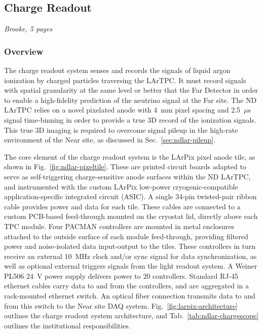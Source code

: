 \subsection{Charge Readout}
\label{sec:lartpc-des-chargero}
{\it Brooke, 5 pages}
\subsubsection{Overview}
\label{sec:lartpc-cro-ovvw}
The charge readout system senses and records the signals of liquid argon ionization by charged particles traversing the LArTPC\@.
It must record signals with spatial granularity at the same level or better that the Far Detector in order to enable a high-fidelity prediction of the neutrino signal at the Far site.
The ND LArTPC relies on a novel pixelated anode with 4~mm pixel spacing and 2.5~$\mu$s signal time-binning in order to provide a true 3D record of the ionization signals.
This true 3D imaging is required to overcome signal pileup in the high-rate environment of the Near site, as discussed in Sec.~\ref{sec:ndlar-pileup}\@.

The core element of the charge readout system is the LArPix pixel anode tile, as shown in Fig.~\ref{fig:ndlar-pixeltile}.
These are printed circuit boards adapted to serve as self-triggering charge-sensitive anode surfaces within the ND LArTPC, and instrumented with the custom LArPix low-power cryogenic-compatible application-specific integrated circuit (ASIC)\@. 
A single 34-pin twisted-pair ribbon cable provides power and data for each tile.
These cables are connected to a custom PCB-based feed-through mounted on the cryostat lid, directly above each TPC module.
Four PACMAN controllers are mounted in metal enclosures attached to the outside surface of each module feed-through, providing filtered power and noise-isolated data input-output to the tiles.
These controllers in turn receive an external 10~MHz clock and/or sync signal for data synchronization, as well as optional external triggers signals from the light readout system.
A Weiner PL506 24~V power supply delivers power to 20 controllers.
Standard RJ-45 ethernet cables carry data to and from the controllers, and are aggregated in a rack-mounted ethernet switch.
An optical fiber connection transmits data to and from this switch to the Near site DAQ system.
Fig.~\ref{fig:larpix-architecture} outlines the charge readout system architecture, and Tab.~\ref{tab:ndlar-chargescope} outlines the institutional responsibilities.

